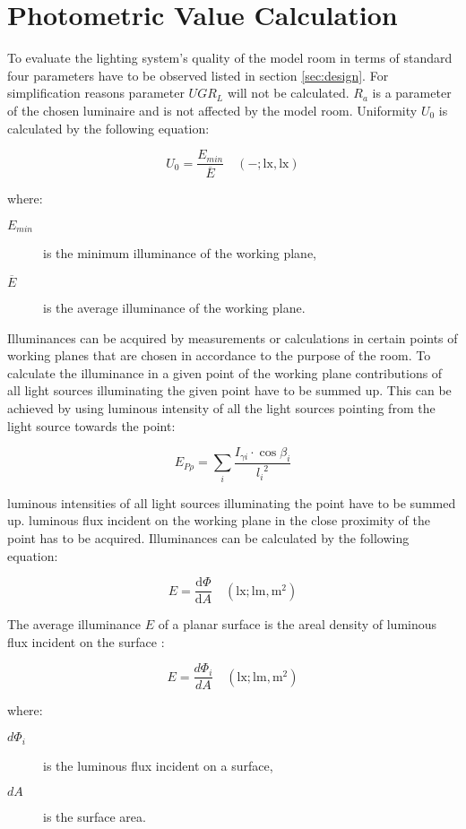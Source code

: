 \section{Photometric Value Calculation}
To evaluate the lighting system's quality of the model room in terms of standard \cite{12464} four parameters have to be observed listed in section \ref{sec:design}. For simplification reasons parameter $UGR_{L}$ will not be calculated. $R_{a}$ is a parameter of the chosen luminaire and is not affected by the model room. Uniformity $U_{0}$ is calculated by the following equation:

\begin{equation}
U_{0}=\frac{E_{min}}{\overline{E}} \quad \mathrm{(-;lx,lx)}
\end{equation}

where:
\begin{description}
	\item[$E_{min}$] is the minimum illuminance of the working plane,
	\item[$\overline{E}$] is the average illuminance of the working plane.
\end{description}

Illuminances can be acquired by measurements or calculations in certain points of working planes that are chosen in accordance to the purpose of the room. To calculate the illuminance in a given point of the working plane contributions of all light sources illuminating the given point have to be summed up. This can be achieved by using luminous intensity of all the light sources pointing from the light source towards the point:

\begin{equation}
E_{P\rho}=\sum_{i} \frac{I_{\gamma i} \cdot \cos{\beta_{i}}}{{l_{i}}^{2}}
\end{equation}




 luminous intensities of all light sources illuminating the point have to be summed up.
luminous flux incident on the working plane in the close proximity of the point has to be acquired. Illuminances can be calculated by the following equation:

\begin{equation}
E=\frac{\mathrm{d}\Phi}{\mathrm{d}A} \quad \mathrm{(lx;lm,m^{2})}
\end{equation}





The average illuminance $E$ of a planar surface is the areal density of luminous flux incident on the surface \cite{Habel}:

\begin{equation} \label{eq:illuminance}
E=\frac{d\Phi_{i}}{dA} \quad \mathrm{(lx;lm,m^2)}
\end{equation}

where:
\begin{description}
	\item[$d\Phi_{i}$] is the luminous flux incident on a surface,
	\item[$dA$] is the surface area.
\end{description}

